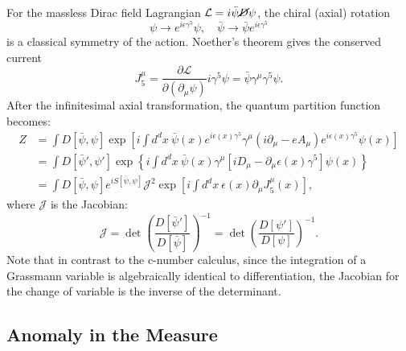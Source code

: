 \documentclass[aps,prb,superscriptaddress,nofootinbib]{revtex4}
\begin{document}
For the massless Dirac field Lagrangian $\mathcal L = i\bar\psi \cancel D \psi$, the chiral (axial) rotation 
\begin{equation}
	\psi \rightarrow e^{i\epsilon \gamma^5}\psi, \quad
	\bar\psi \rightarrow \bar\psi e^{i\epsilon \gamma^5}
\end{equation}
is a classical symmetry of the action.
Noether's theorem gives the conserved current
\begin{equation}
	J^\mu_5 = \frac{\partial \mathcal L}{\partial(\partial_\mu \psi)} i\gamma^5\psi = \bar\psi \gamma^\mu \gamma^5\psi.
\end{equation}
After the infinitesimal axial transformation, the quantum partition function becomes:
\begin{equation}\label{eq:AN-CH-partition}
\begin{aligned}
	Z &= \int D[\bar\psi,\psi] \exp\left[i\int d^d x\ \bar\psi(x) e^{i\epsilon(x)\gamma^5}\gamma^\mu(i\partial_\mu - e A_\mu) e^{i\epsilon(x)\gamma^5}\psi(x) \right] \\
	&= \int D[\bar\psi',\psi'] \exp\left\{i\int d^d x\ \bar\psi(x) \gamma^\mu\left[iD_\mu-\partial_\mu\epsilon(x)\gamma^5\right] \psi(x) \right\} \\
	&= \int D[\bar\psi,\psi] e^{iS[\bar\psi,\psi]} \mathcal J^2 \exp\left[i \int d^d x\ \epsilon(x) \partial_\mu J_5^\mu(x) \right],
\end{aligned}
\end{equation}
where $\mathcal J$ is the Jacobian:
\begin{equation}
	\mathcal J = \det\left(\frac{D[\bar\psi']}{D[\bar\psi]}\right)^{-1}=\det\left(\frac{D[\psi']}{D[\psi]}\right)^{-1}.
\end{equation}
Note that in contrast to the c-number calculus, since the integration of a Grassmann variable is algebraically identical to differentiation, the Jacobian for the change of variable is the inverse of the determinant.


\subsection{Anomaly in the Measure}
\end{document}
